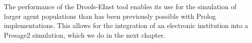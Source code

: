 The performance of the Drools-EInst tool enables its use for the simulation of
larger agent populations than has been previously possible with Prolog
implementations. This allows for the integration of an electronic institution
into a Presage2 simulation, which we do in the next chapter.






